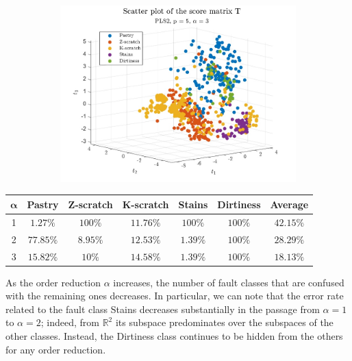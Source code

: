 \begin{frame}
	\begin{figure}
		\begin{subfigure}[b]{0.80\textwidth}
			\includegraphics[width=\textwidth]{Images/scatter_T_a3_p5.pdf}
		\end{subfigure}
	\end{figure}
\end{frame}

\begin{frame}
	\begin{table}
		\centering
		\renewcommand\arraystretch{1.3}
		\begin{tabular}{c|c|c|c|c|c|c}
			\hline
			$\boldsymbol{\alpha}$ & \textbf{Pastry} & \textbf{Z-scratch} & \textbf{K-scratch} & \textbf{Stains} & \textbf{Dirtiness} & \textbf{Average}\\
			\hline
			\num{1} & $1.27\%$ & $100\%$ & $11.76\%$ & $100\%$ & $100\%$ & $42.15\%$ \\
			\num{2} & $77.85\%$ & $8.95\%$ & $12.53\%$ & $1.39\%$ & $100\%$ & $28.29\%$ \\
			\num{3} & $15.82\%$ & $10\%$ & $14.58\%$ & $1.39\%$ & $100\%$ & $18.13\%$ \\ 
			\hline
		\end{tabular}
	\end{table}
	As the order reduction $\alpha$ increases, the number of fault classes that are confused with the remaining ones decreases. In particular, we can note that the error rate related to the fault class Stains decreases substantially in the passage from $\alpha = 1$ to $\alpha = 2$; indeed, from $\mathbb{R}^2$ its subspace predominates over the subspaces of the other classes. Instead, the Dirtiness class continues to be hidden from the others for any order reduction. 
\end{frame}
